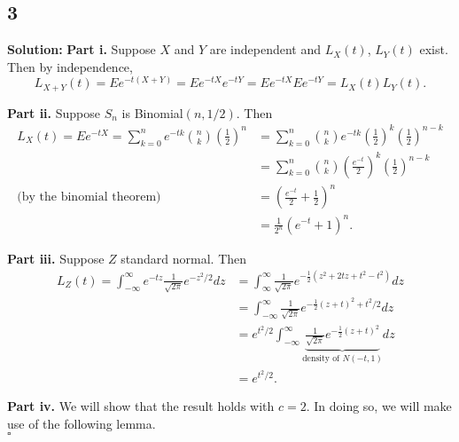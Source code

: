 \documentclass[12pt]{article}
\newcounter{ProofCounter}
\newenvironment{Solution}{\stepcounter{ProofCounter}\textbf{Solution:}}{\hfill$\square$}
\begin{document}
\subsection*{3}
\begin{Solution}
  \textbf{Part i.} Suppose $X$ and $Y$ are independent and $L_X(t)$, $L_Y(t)$ exist. Then by independence,
  \[
    L_{X + Y}(t) = Ee^{-t(X + Y)} = Ee^{-tX}e^{-tY} = Ee^{-tX}Ee^{-tY} = L_X(t) L_Y(t).
  \]

  \textbf{Part ii.} Suppose $S_n$ is Binomial$(n, 1/2)$. Then
  \begin{align*}
    L_{X}(t) = Ee^{-tX} = \sum_{k=0}^{n} e^{-tk} \binom{n}{k} \left( \frac{1}{2} \right)^n & = \sum_{k=0}^{n} \binom{n}{k} e^{-tk} \left( \frac{1}{2} \right)^k \left( \frac{1}{2} \right)^{n-k} \\
    & = \sum_{k=0}^{n} \binom{n}{k} \left( \frac{e^{-t}}{2} \right)^k \left( \frac{1}{2} \right)^{n-k} \\
    \text{(by the binomial theorem)} \ \ \ & = \left( \frac{e^{-t}}{2} + \frac{1}{2} \right)^{n} \\
    & = \frac{1}{2^{n}} \left( e^{-t} + 1 \right)^{n}.
  \end{align*}

  \textbf{Part iii.} Suppose $Z$ standard normal. Then
  \begin{align*}
    L_Z(t) = \int_{-\infty}^{\infty} e^{-tz} \frac{1}{\sqrt{2\pi}} e^{-z^2 / 2} dz & = \int_{\infty}^{\infty} \frac{1}{\sqrt{2\pi}} e^{-\frac{1}{2}(z^2 + 2tz + t^2 - t^2)} dz \\
    & = \int_{-\infty}^{\infty} \frac{1}{\sqrt{2\pi}} e^{-\frac{1}{2}(z + t)^2 + t^2 / 2} dz \\
    & = e^{t^2 / 2} \int_{-\infty}^{\infty}\underbrace{ \frac{1}{\sqrt{2\pi}} e^{-\frac{1}{2}(z + t)^2} }_{\text{density of $N(-t, 1)$}} dz \\
    & = e^{t^2 / 2}.
  \end{align*}

  \textbf{Part iv.} We will show that the result holds with $c = 2$. In doing so, we will make use of the following lemma. \\


\end{Solution}
\end{document}
